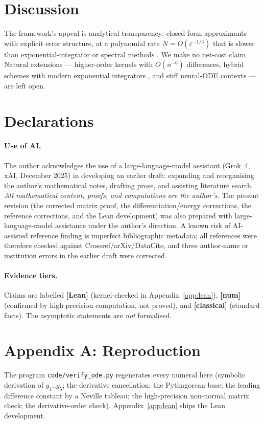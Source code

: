 \documentclass[11pt]{article}
\theoremstyle{plain}
\theoremstyle{definition}
\theoremstyle{remark}
\begin{document}
\section{Discussion}

The framework's appeal is analytical transparency: closed-form approximants with
explicit error structure, at a polynomial rate $N=O(\varepsilon^{-1/3})$ that is
slower than exponential-integrator or spectral methods
\cite{HochbruckOstermann,TrefethenBau}. We make no net-cost claim. Natural
extensions --- higher-order kernels with $O(n^{-6})$ differences, hybrid schemes
with modern exponential integrators \cite{ChenBorzi,QiDengZhu,AlMohyPhi,AlMohyLiu},
and stiff neural-ODE contexts \cite{FronkPetzoldChaos,FronkPetzoldArxiv} --- are
left open.

\section*{Declarations}

\paragraph{Use of AI.} The author acknowledges the use of a large-language-model
assistant (Grok~4, xAI, December 2025) in developing an earlier draft: expanding
and reorganising the author's mathematical notes, drafting prose, and assisting
literature search. \emph{All mathematical content, proofs, and computations are
the author's.} The present revision (the corrected matrix proof, the
differentiation/energy corrections, the reference corrections, and the Lean
development) was also prepared with large-language-model assistance under the
author's direction. A known risk of AI-assisted reference finding is imperfect
bibliographic metadata; all references were therefore checked against
Crossref/arXiv/DataCite, and three author-name or institution errors in the
earlier draft were corrected.

\paragraph{Evidence tiers.} Claims are labelled \textbf{[Lean]}
(kernel-checked in Appendix~\ref{app:lean}), \textbf{[num]} (confirmed by
high-precision computation, not proved), and \textbf{[classical]} (standard
facts). The asymptotic statements are \emph{not} formalised.

\section*{Appendix A: Reproduction}
The program \texttt{code/verify\_ode.py} regenerates every numeral here
(symbolic derivation of $g_1..g_5$; the derivative cancellation; the Pythagorean
base; the leading difference constant by a Neville tableau; the high-precision
non-normal matrix check; the derivative-order check). Appendix~\ref{app:lean}
ships the Lean development.
\end{document}
